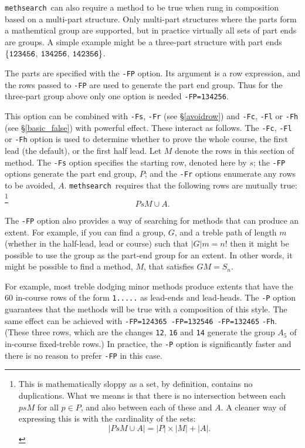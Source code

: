 \documentclass[a4paper,11pt,oneside]{book}
\makeatletter
\newcommand{\oidx}[2]{\index{#1@{\hspace*{-\optwidth}\texttt{-}#2}|ulink}}
\newcommand{\oi}[1]{\index{#1@{\hspace*{-\optwidth}\texttt{-}\texttt{#1}}}}
\def\methsearch{\texttt{meth\-search}}
\newcommand{\sref}[1]{\hyperref[#1]{\S\ref{#1}}}
\makeatother
\begin{document}
\methsearch\ can also require a method to be true when rung in composition
based on a multi-part structure.  Only multi-part structures where the
parts form a mathemtical group are supported, 
but in practice virtually all sets of part ends are groups.  
A simple example might be a three-part
structure with part ends $\{\hbox{\verb+123456+}$, $\hbox{\verb+134256+}$,
$\hbox{\verb+142356+}\}$.

The parts are specified with the \verb+-FP+\oidx{FP}{\texttt{FP}} option. 
Its argument is a row expression, and the rows passed to \verb+-FP+ are used 
to generate the part end group.  
Thus for the three-part group above only one option is needed 
\verb+-FP=134256+.

This option can be combined with \verb+-Fs+,\oi{Fs} \verb+-Fr+\oi{Fr} 
(see \sref{avoidrow}) and \verb+-Fc+,\oi{Fc} 
\verb+-Fl+\oi{Fl} or \verb+-Fh+\oi{Fh} (see \sref{basic_false}) 
with powerful effect.  These interact as follows.
The \verb+-Fc+, \verb+-Fl+ or \verb+-Fh+ option is used to 
determine whether to prove the whole course,
the first lead (the default), or the first half lead.  
Let $M$ denote the rows in this section of method.
The \verb+-Fs+ option specifies the starting row, denoted here by $s$;
the \verb+-FP+ options generate the part end group, $P$; and 
the \verb+-Fr+ options enumerate any rows to be avoided, $A$.
\methsearch\ requires that the following rows are mutually true:%
\footnote{This is mathematically sloppy as a set, by definition,
contains no duplications.  What we means is that there is no intersection
between each $psM$ for all $p \in P$, and also between each of these and $A$.
A cleaner way of expressing this is with the cardinality%
 of the sets: 
\[ \left| P s M \cup A \right| 
 = \left|P\right| \times \left|M\right| + \left|A\right|. \]
} %
\[ PsM \cup A. \]

The \verb+-FP+ option also provides a way of searching for methods that
can produce an extent.
For example, if you can find a group, $G$, and a treble path of length $m$ 
(whether in the half-lead, lead or course) such that $\left|G\right|m = n!$
then it might be possible to use the group as the part-end group for an extent.
In other words, it might be possible to find a method, $M$, that satisfies
$GM=S_n$.  

For example, most treble dodging minor methods produce extents
that have the {60} in-course rows of the form \verb+1.....+ as lead-ends
and lead-heads.  The \verb+-P+ option guarantees that the methods will be
true with a composition of this style.  The same effect can be 
achieved with \verb+-FP=124365 -FP=132546 -FP=132465+ \verb+-Fh+.  
(These three rows, which are the changes \verb+12+, \verb+16+ and \verb+14+ 
generate the group $A_5$ of in-course fixed-treble rows.)  
In practice, the \verb+-P+ option is significantly faster and there is no 
reason to prefer \verb+-FP+ in this case.\oi{P}
\end{document}
